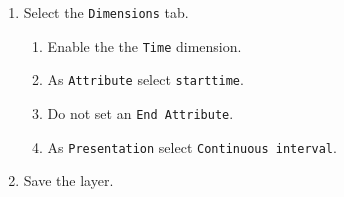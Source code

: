 \begin{enumerate}[resume]
	\item Select the \lstinline|Dimensions| tab.
	\begin{enumerate}
		\item Enable the the \lstinline|Time| dimension.
		\item As \lstinline|Attribute| select \lstinline|starttime|.
		\item Do not set an \lstinline|End Attribute|.
		\item As \lstinline|Presentation| select \lstinline|Continuous interval|.
	\end{enumerate}
	\item Save the layer.
\end{enumerate}

